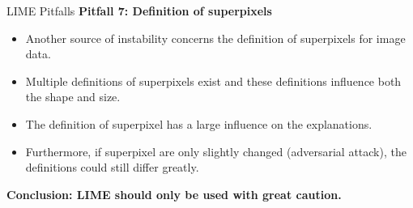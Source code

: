 \documentclass[11pt,compress,t,notes=noshow, xcolor=table]{beamer}
\begin{document}
\begin{vbframe}{LIME Pitfalls}
\textbf{Pitfall 7: Definition of superpixels}
\begin{itemize}
	\item Another source of instability concerns the definition of superpixels for image data. 
	\item Multiple definitions of superpixels exist and these definitions influence both the shape and size. 
	\item The definition of superpixel has a large influence on the explanations. 
	\item Furthermore, if superpixel are only slightly changed (adversarial attack), the definitions could still differ greatly.  
\end{itemize}

\textbf{Conclusion: LIME should only be used with great caution.}

\end{vbframe}

%	


\endlecture
\end{document}
